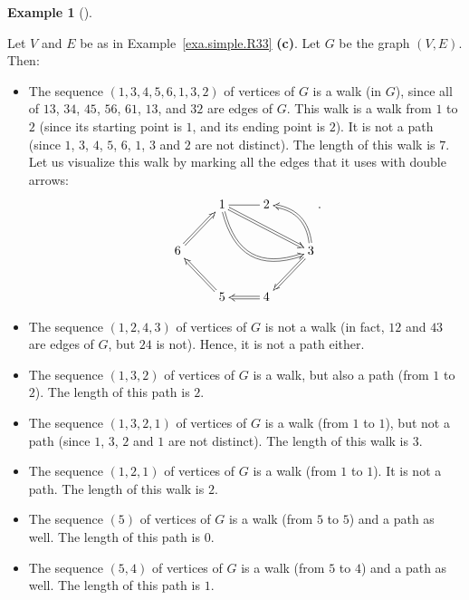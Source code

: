 \documentclass[numbers=enddot,12pt,final,onecolumn,notitlepage]{scrartcl}%
\makeatletter
\theoremstyle{definition}
\newtheorem{exam}[theo]{Example}
\newenvironment{example}[1][]
{\begin{exam}[#1]\begin{leftbar}}
{\end{leftbar}\end{exam}}
\newcommand{\tup}[1]{\left( #1 \right)}
\newcommand{\are}{\ar@{-}}
\makeatother
\begin{document}
\begin{example} \label{exa.intro.walks}
Let $V$ and $E$ be as in Example~\ref{exa.simple.R33} \textbf{(c)}.
Let $G$ be the graph $\tup{V, E}$. Then:

\begin{itemize}
\item The sequence $\tup{1, 3, 4, 5, 6, 1, 3, 2}$ of vertices of $G$
is a walk (in $G$), since all of $13$, $34$, $45$, $56$, $61$, $13$,
and $32$ are edges of $G$. This walk is a walk from $1$ to $2$ (since
its starting point is $1$, and its ending point is $2$). It is not a
path (since $1$, $3$, $4$, $5$, $6$, $1$, $3$ and $2$ are not
distinct). The length of this walk is $7$.
Let us visualize this walk by marking all the edges that it uses with
double arrows:
\begin{align*}
\xymatrix{
& 1 \are[r] \ar@{=>}[rrd] \ar@/_2pc/@{=>}[rrd] & 2 \\
6 \ar@{=>}[ru] & & & 3 \ar@{=>}[ld] \ar@/_1pc/@{=>}[lu] \\
& 5 \ar@{=>}[lu] & 4 \ar@{=>}[l]
} .
\end{align*}

\item The sequence $\tup{1, 2, 4, 3}$ of vertices of $G$ is not a walk
(in fact, $12$ and $43$ are edges of $G$, but $24$ is not). Hence, it
is not a path either.

\item The sequence $\tup{1, 3, 2}$ of vertices of $G$ is a walk, but
also a path (from $1$ to $2$). The length of this path is $2$.

\item The sequence $\tup{1, 3, 2, 1}$ of vertices of $G$ is a walk
(from $1$ to $1$), but not a path (since $1$, $3$, $2$ and $1$ are
not distinct). The length of this walk is $3$.

\item The sequence $\tup{1, 2, 1}$ of vertices of $G$ is a walk
(from $1$ to $1$). It is not a path. The length of this walk is $2$.

\item The sequence $\tup{5}$ of vertices of $G$ is a walk (from $5$
to $5$) and a path as well. The length of this path is $0$.

\item The sequence $\tup{5, 4}$ of vertices of $G$ is a walk (from $5$
to $4$) and a path as well. The length of this path is $1$.
\end{itemize}
\end{example}
\end{document}

